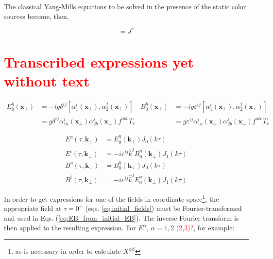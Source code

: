 The classical Yang-Mills equations to be solved in the presence of the static color sources become, then,

\begin{equation}
	[D_\mu, F^{\mu \nu}] = J^\nu
\end{equation}

\section{\textcolor{red}{Transcribed expressions yet without text}}

\begin{subequations} \label{eq:initial_fields}
	\begin{equation}
		\begin{split}
			E^\eta_0(\mathbf{x}_\perp) & = -ig \delta^{ij} [\alpha^i_1 (\mathbf{x}_\perp), \alpha^j_2(\mathbf{x}_\perp)] \\
			& = g \delta^{ij}   \alpha^i_{1a} (\mathbf{x}_\perp) \alpha^j_{2b}(\mathbf{x}_\perp)f^{abc} T_c
		\end{split} \label{eq:initial_E}
	\end{equation}
	\begin{equation}
		\begin{split}
			B^\eta_0(\mathbf{x}_\perp) & = -ig \varepsilon^{ij} [\alpha^i_1 (\mathbf{x}_\perp), \alpha^j_2(\mathbf{x}_\perp)] \\
			& = g \varepsilon^{ij} \alpha^i_{1a} (\mathbf{x}_\perp) \alpha^j_{2b}(\mathbf{x}_\perp) f^{abc} T_c
		\end{split} \label{eq:initial_B}
	\end{equation}
\end{subequations}

\begin{subequations} \label{eq:EB_from_initial_EB}
	\begin{align}
		E^\eta(\tau,\mathbf{k}_\perp) & = E^\eta_0 (\mathbf{k}_\perp) J_0 (k \tau) \\
		E^i(\tau,\mathbf{k}_\perp) & = -i \varepsilon^{ij} \hat{k}^j B_0^\eta (\mathbf{k}_\perp) J_1 (k \tau) \\
		B^\eta(\tau,\mathbf{k}_\perp) & = B^\eta_0 (\mathbf{k}_\perp) J_0 (k \tau) \\
		B^i(\tau,\mathbf{k}_\perp) & = -i \varepsilon^{ij} \hat{k}^j E_0^\eta (\mathbf{k}_\perp) J_1 (k \tau)
	\end{align}
\end{subequations}

In order to get expressions for one of the fields in coordinate  space\textcolor{red}{\footnote{as is necessary in order to calculate $X^{\alpha \beta}$}}, the appropriate field at $\tau=0^+$ (eqs. \ref{eq:initial_fields}) must be Fourier-transformed and used in Eqs. (\ref{eq:EB_from_initial_EB}). The inverse Fourier transform is then applied to the resulting expression. For $E^\alpha$, $\alpha=1,2$ \textcolor{red}{(2,3)?}, for example:

